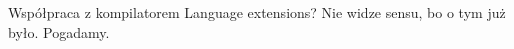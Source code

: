 \begin{frame}[fragile]{Współpraca z kompilatorem}
	Language extensions? Nie widze sensu, bo o tym już było. Pogadamy.
\end{frame}
